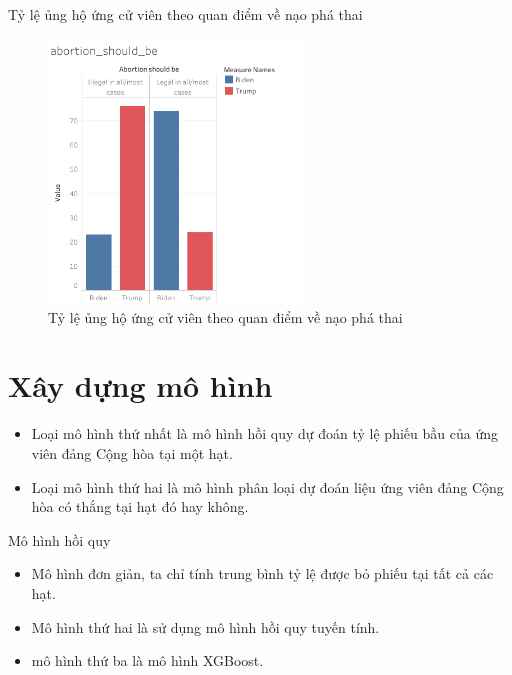 \documentclass[10pt]{beamer}
\theoremstyle{remark}
\theoremstyle{definition}
\begin{document}
\begin{frame}{Tỷ lệ ủng hộ ứng cử viên theo quan điểm về nạo phá thai}
	\begin{figure}[h!]
        \centering
        \includegraphics[width=0.6\textwidth]{figures/abortion_should_be.png}
        \caption{Tỷ lệ ủng hộ ứng cử viên theo quan điểm về nạo phá thai}
    \end{figure}
\end{frame}

\section{Xây dựng mô hình}

\begin{frame}
	\begin{itemize}
		\item Loại mô hình thứ nhất là mô hình hồi quy dự đoán tỷ lệ phiếu bầu của ứng viên đảng Cộng hòa tại một hạt.
		\item Loại mô hình thứ hai là mô hình phân loại dự đoán liệu ứng viên đảng Cộng hòa có thắng tại hạt đó hay không.
	\end{itemize}
\end{frame}

\begin{frame}{Mô hình hồi quy}

    \begin{itemize}
        \item Mô hình đơn giản, ta chỉ tính trung bình tỷ lệ được bỏ phiếu tại tất cả các hạt.
        \item Mô hình thứ hai là sử dụng mô hình hồi quy tuyến tính.
        \item mô hình thứ ba là mô hình XGBoost.
    \end{itemize}
\end{frame}
\end{document}
